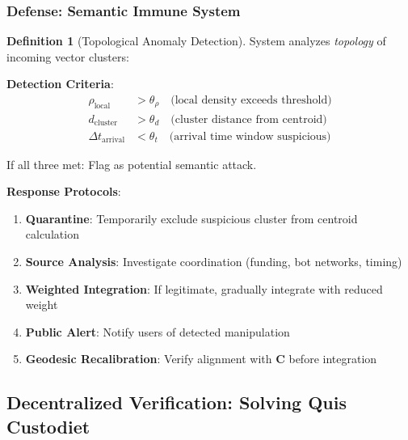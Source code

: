 \documentclass[11pt,a4paper]{article}
\theoremstyle{definition}
\newtheorem{definition}{Definition}[section]
\theoremstyle{remark}
\begin{document}
\subsubsection{Defense: Semantic Immune System}

\begin{definition}[Topological Anomaly Detection]
System analyzes \textit{topology} of incoming vector clusters:

\textbf{Detection Criteria}:
\begin{align}
\rho_{\text{local}} &> \theta_{\rho} \quad \text{(local density exceeds threshold)} \\
d_{\text{cluster}} &> \theta_d \quad \text{(cluster distance from centroid)} \\
\Delta t_{\text{arrival}} &< \theta_t \quad \text{(arrival time window suspicious)}
\end{align}

If all three met: Flag as potential semantic attack.
\end{definition}

\textbf{Response Protocols}:
\begin{enumerate}
\item \textbf{Quarantine}: Temporarily exclude suspicious cluster from centroid calculation
\item \textbf{Source Analysis}: Investigate coordination (funding, bot networks, timing)
\item \textbf{Weighted Integration}: If legitimate, gradually integrate with reduced weight
\item \textbf{Public Alert}: Notify users of detected manipulation
\item \textbf{Geodesic Recalibration}: Verify alignment with \(\mathbf{C}\) before integration
\end{enumerate}

\subsection{Decentralized Verification: Solving Quis Custodiet}
\end{document}
